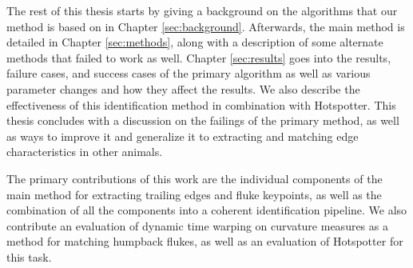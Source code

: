 The rest of this thesis starts by giving a background on the algorithms that our method is based on in Chapter \ref{sec:background}.
Afterwards, the main method is detailed in Chapter \ref{sec:methods}, along with a description of some alternate methods that failed to work as well.
Chapter \ref{sec:results} goes into the results, failure cases, and success cases of the primary algorithm as well as various parameter changes and how they affect the results.
We also describe the effectiveness of this identification method in combination with Hotspotter.
This thesis concludes with a discussion on the failings of the primary method, as well as ways to improve it and generalize it to extracting and matching edge characteristics in other animals.


The primary contributions of this work are the individual components of the main method for extracting trailing edges and fluke keypoints, as well as the combination of all the components into a coherent identification pipeline.
We also contribute an evaluation of dynamic time warping on curvature measures as a method for matching humpback flukes, as well as an evaluation of Hotspotter for this task.









